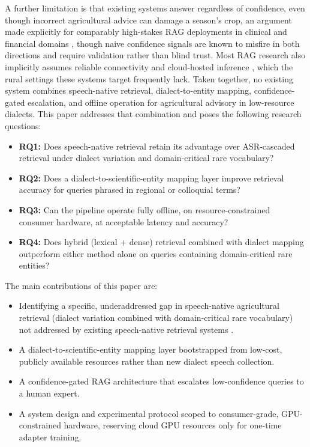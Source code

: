 \documentclass[conference]{IEEEtran}
\begin{document}
A further limitation is that existing systems answer regardless of confidence, even though incorrect agricultural advice can damage a season's crop, an argument made explicitly for comparably high-stakes RAG deployments in clinical and financial domains \cite{dependablerag2026, abstinence2025}, though naive confidence signals are known to misfire in both directions \cite{intrygue2026} and require validation rather than blind trust. Most RAG research also implicitly assumes reliable connectivity and cloud-hosted inference \cite{compactllm2026}, which the rural settings these systems target frequently lack. Taken together, no existing system combines speech-native retrieval, dialect-to-entity mapping, confidence-gated escalation, and offline operation for agricultural advisory in low-resource dialects. This paper addresses that combination and poses the following research questions:

\begin{itemize}
    \item \textbf{RQ1:} Does speech-native retrieval retain its advantage over ASR-cascaded retrieval under dialect variation and domain-critical rare vocabulary?

    \item \textbf{RQ2:} Does a dialect-to-scientific-entity mapping layer improve retrieval accuracy for queries phrased in regional or colloquial terms?

    \item \textbf{RQ3:} Can the pipeline operate fully offline, on resource-constrained consumer hardware, at acceptable latency and accuracy?

    \item \textbf{RQ4:} Does hybrid (lexical + dense) retrieval combined with dialect mapping outperform either method alone on queries containing domain-critical rare entities?
\end{itemize}

The main contributions of this paper are:


\begin{itemize}
    \item Identifying a specific, underaddressed gap in speech-native agricultural retrieval (dialect variation combined with domain-critical rare vocabulary) not addressed by existing speech-native retrieval systems \cite{min2025speechrag, google2025s2r}.

    \item A dialect-to-scientific-entity mapping layer bootstrapped from low-cost, publicly available resources rather than new dialect speech collection.

    \item A confidence-gated RAG architecture that escalates low-confidence queries to a human expert.

    \item A system design and experimental protocol scoped to consumer-grade, GPU-constrained hardware, reserving cloud GPU resources only for one-time adapter training.
\end{itemize}
\end{document}
